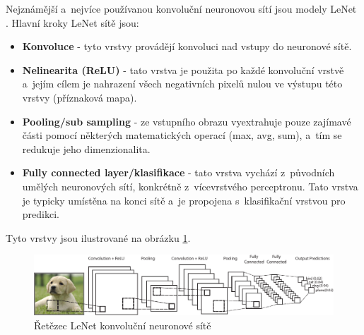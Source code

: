 Nejznámější a~nejvíce používanou konvoluční neuronovou sítí jsou modely LeNet \cite{lenet}.
Hlavní kroky LeNet sítě jsou:
\begin{itemize}
  \item{\textbf{Konvoluce} - tyto vrstvy provádějí konvoluci nad vstupy do neuronové sítě.}
  \item{\textbf{Nelinearita (ReLU)} - tato vrstva je použita po každé konvoluční vrstvě a~jejím cílem je nahrazení všech negativních pixelů nulou ve výstupu této vrstvy (příznaková mapa).}
  \item{\textbf{Pooling/sub sampling} - ze vstupního obrazu vyextrahuje pouze zajímavé části pomocí některých matematických operací (max, avg, sum), a~tím se redukuje jeho dimenzionalita.}
  \item{\textbf{Fully connected layer/klasifikace} - tato vrstva vychází z~původních umělých neuronových sítí, konkrétně z~vícevrstvého perceptronu. Tato vrstva je typicky umístěna na konci sítě a~je propojena s~klasifikační vrstvou pro predikci.}
\end{itemize}

Tyto vrstvy jsou ilustrované na obrázku \ref{fig:cnn}.
\begin{figure}[H]
\centering
\includegraphics[width=1.1\linewidth]{figures/cnn.pdf}
\caption{Řetězec LeNet konvoluční neuronové sítě \cite{lenet}}
\label{fig:cnn}
\end{figure}